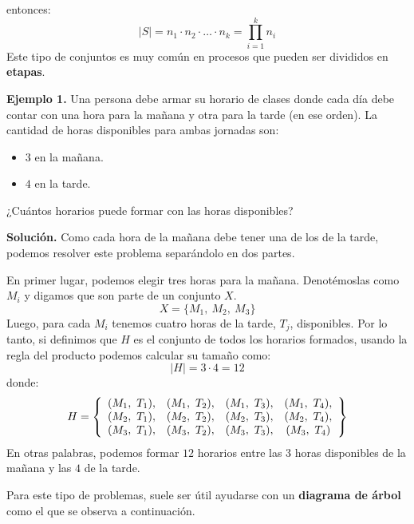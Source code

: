 \documentclass[12pt]{article}
\begin{document}
entonces:
\[
  |S| = n_{1} \cdot n_{2} \cdot \ldots \cdot n_{k} = \prod_{i = 1}^{k} n_{i}
\]
Este tipo de conjuntos es muy común en procesos que pueden ser divididos en \textbf{etapas}.

\textbf{Ejemplo 1.} Una persona debe armar su horario de clases donde cada día debe contar con una hora para la mañana y otra para la tarde (en ese orden). La cantidad de horas disponibles para ambas jornadas son:

\begin{itemize}
\item $3$ en la mañana.
\item $4$ en la tarde.
\end{itemize}

¿Cuántos horarios puede formar con las horas disponibles?

\textbf{Solución.} Como cada hora de la mañana debe tener una de los de la tarde, podemos resolver este problema separándolo en dos partes.

En primer lugar, podemos elegir tres horas para la mañana. Denotémoslas como $M_{i}$ y digamos que son parte de un conjunto $X$.
\[
  X = \{M_{1}, \ M_{2}, \ M_{3}\}
\]
Luego, para cada $M_{i}$ tenemos cuatro horas de la tarde, $T_{j}$, disponibles. Por lo tanto, si definimos que $H$ es el conjunto de todos los horarios formados, usando la regla del producto podemos calcular su tamaño como:
\[
  |H| = 3 \cdot 4 = 12
\]
donde:
\[
H =
\left\{
\begin{array}{c c c c}
(M_{1}, \ T_{1}), & (M_{1}, \ T_{2}), & (M_{1}, \ T_{3}), & (M_{1}, \ T_{4}), \\
(M_{2}, \ T_{1}), & (M_{2}, \ T_{2}), & (M_{2}, \ T_{3}), & (M_{2}, \ T_{4}), \\
(M_{3}, \ T_{1}), & (M_{3}, \ T_{2}), & (M_{3}, \ T_{3}), & (M_{3}, \ T_{4})
\end{array}
\right\}
\]
En otras palabras, podemos formar $12$ horarios entre las $3$ horas disponibles de la mañana y las $4$ de la tarde.

Para este tipo de problemas, suele ser útil ayudarse con un \textbf{diagrama de árbol} como el que se observa a continuación.
\end{document}
